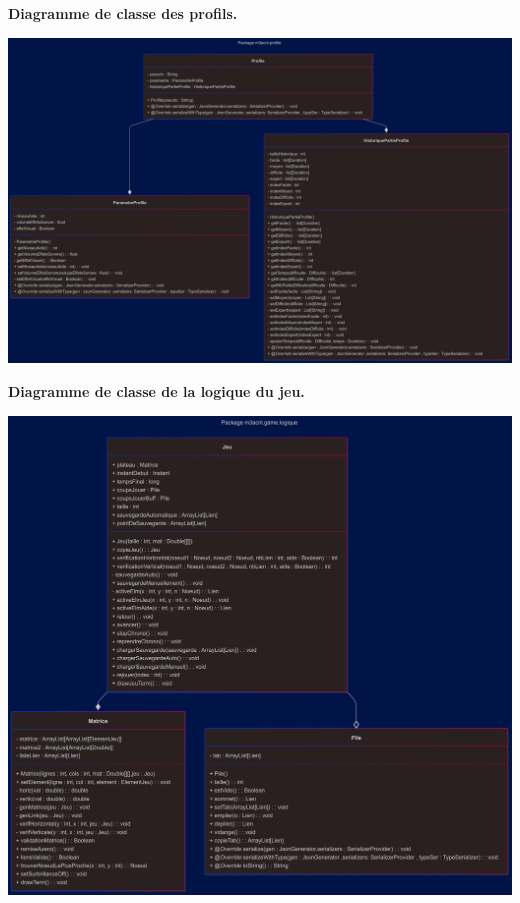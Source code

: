 \textbf{Diagramme de classe des profils.}\\
\begin{center}
    \includegraphics[width=\textwidth,height=\textheight,keepaspectratio]{../Annexe/classes/profile.png}
\end{center}

\pagebreak

\textbf{Diagramme de classe de la logique du jeu.}\\
\begin{center}
    \includegraphics[width=\textwidth,height=\textheight,keepaspectratio]{../Annexe/classes/logique.png}
\end{center}

